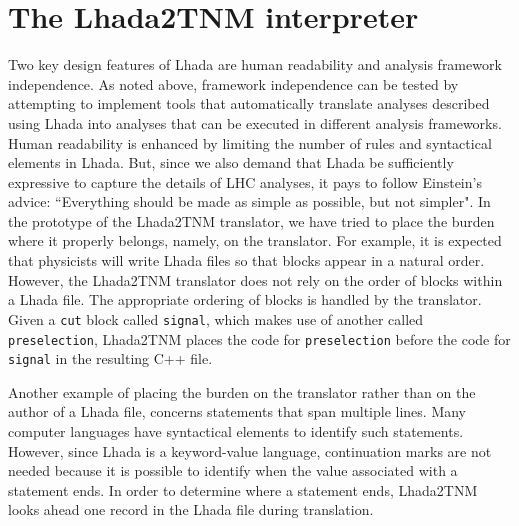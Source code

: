 \documentclass[11pt]{cernrep}
\begin{document}
\section{The {\sc Lhada2TNM} interpreter}
%

Two key design features of {\sc Lhada} are human readability and analysis framework independence. As noted above, framework independence can be tested by attempting to implement tools that automatically translate analyses described using {\sc Lhada} into analyses that can be executed in different analysis frameworks. Human readability is enhanced by limiting the number of rules and syntactical elements in {\sc Lhada}. But, since we also demand that {\sc Lhada} be sufficiently expressive to capture the details of LHC analyses, it pays to follow Einstein's advice: ``Everything should be made as simple as possible, but not simpler".    In the prototype of the  {\sc Lhada2TNM} translator, we have tried to place the burden where it properly belongs, namely, on the translator. For example, it is expected that physicists will write {\sc Lhada} files so that blocks appear in a natural order. However, the {\sc Lhada2TNM} translator does not rely on the order of blocks within a {\sc Lhada} file. The appropriate ordering of blocks is handled by the translator. Given a {\tt cut} block called {\tt signal}, which makes use of another called {\tt preselection}, {\sc Lhada2TNM} places  the code for {\tt preselection} before the code for {\tt signal} in the resulting C++ file.

Another example of placing the burden on the translator rather than on the author of a {\sc Lhada} file, concerns statements that span multiple lines. Many computer languages have syntactical elements to identify such statements. However, since {\sc Lhada} is a keyword-value language, continuation marks are not needed because it is possible to identify when the value associated with a statement ends. In order to determine where a statement ends, {\sc Lhada2TNM} looks ahead one record in the {\sc Lhada} file during translation.
\end{document}
